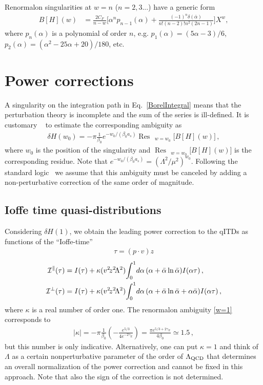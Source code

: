 \documentclass[aps,prd,twocolumn,a4paper,superscriptaddress,10pt,showpacs,notitlepage,floatfix]{revtex4-1}
\DeclareMathOperator*{\res}{\text{Res~~}}
\begin{document}
Renormalon singularities at $w=n$ ($n=2,3...$) have a generic form
\begin{align}
B[H](w)&=\frac{2C_F}{n-w}\Big[\alpha^np_{n-1}(\alpha)+\frac{(-1)^n\delta(\bar \alpha)}{n!(n\!-\!2)!n^2(2n\!-\!1)}\Big] X^w,
\end{align}
where $p_n(\alpha)$ is a polynomial of order $n$, e.g. $p_1(\alpha)=(5\alpha-3)/6$, $p_2(\alpha)=(\alpha^2-25\alpha+20)/180$, etc.


%
\section{Power corrections}\label{sect_powercorrections}%
%

A singularity on the integration path in Eq.~\eqref{BorelIntegral} means that the perturbation theory is 
incomplete and the sum of the series is ill-defined. 
It is customary ~\cite{Beneke:1998ui} to estimate the corresponding ambiguity as
\begin{align}
\delta H(w_0)  = -\pi \frac{1}{\beta_0}  e^{-w_0/(\beta_0 a_s)} \res_{w=w_0}\big[B[H](w)\big]\,, 
\end{align}
where $w_0$ is the position of the singularity and $\displaystyle{\res_{w=w_0}\big[B[H](w)\big]}$ is the corresponding residue. Note that  $ e^{-w_0/(\beta_0 a_s)} = (\Lambda^2/\mu^2)^{w_0}$. Following the standard logic~\cite{Beneke:1998ui,Beneke:2000kc} we assume that this ambiguity must be 
canceled by adding a non-perturbative correction of the same order of magnitude. 

%
\subsection{Ioffe time quasi-distributions}\label{sect_qITD}%
%

Considering $\delta H(1)$, we obtain the leading power correction to the qITDs as functions of the ``Ioffe-time''
\begin{align}
 \tau = (p\cdot v) z 
\end{align}
\begin{align}
\label{t4-qITD}
  \mathcal{I}^\parallel(\tau) 
&= I(\tau) +
  \kappa (v^2\! z^2\!\Lambda^2)\! \int_0^1\!d\alpha \, (\alpha + \bar\alpha \ln \bar\alpha)I(\alpha \tau )\,,
\notag\\
  \mathcal{I}^\perp(\tau)
&= I(\tau) +
  \kappa (v^2\! z^2\!\Lambda^2) \!\int_0^1\!d\alpha \, (\alpha + \bar\alpha \ln \bar\alpha + \alpha\bar\alpha)I(\alpha \tau )\,,
\end{align}
where $\kappa$ is a real number of order one. The renormalon ambiguity \eqref{w=1} corresponds to 
\begin{align}
  |\kappa| = -\pi \frac{1}{\beta_0}\left(- \frac{ e^{5/3}}{4 e^{-2\gamma_E}}\right) = \frac{\pi e^{5/3+2\gamma_E}}{4 \beta_0} \simeq 1.5\,,  
\end{align} 
but this number is only indicative. Alternatively, one can put $\kappa=1$ and think of $\Lambda$ as a certain nonperturbative 
parameter of the order of $\Lambda_{\rm QCD}$ that determines an overall normalization of the power correction and 
cannot be fixed in this approach. Note that also the sign of the correction is not determined.
\end{document}
